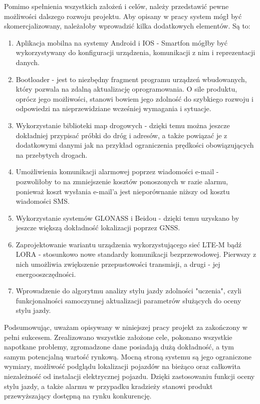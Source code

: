 Pomimo spełnienia wszystkich założeń i celów, należy przedstawić pewne możliwości dalszego rozwoju projektu. Aby opisany w pracy system mógł być skomercjalizowany, należałoby wprowadzić kilka dodatkowych elementów. Są to:

\begin{enumerate}
\item Aplikacja mobilna na systemy Android i IOS - Smartfon mógłby być wykorzystywany do konfiguracji urządzenia, komunikacji z nim i reprezentacji danych.
\item Bootloader - jest to niezbędny fragment programu urządzeń wbudowanych, który pozwala na zdalną aktualizację oprogramowania. O sile produktu, oprócz jego możliwości, stanowi bowiem jego zdolność do szybkiego rozwoju i odpowiedzi na nieprzewidziane wcześniej wymagania i sytuacje.
\item Wykorzystanie biblioteki map drogowych - dzięki temu można jeszcze dokładniej przypisać próbki do dróg i adresów, a także powiązać je z dodatkowymi danymi jak na przykład ograniczenia prędkości obowiązujących na przebytych drogach.
\item Umożliwienia komunikacji alarmowej poprzez wiadomości e-mail - pozwoliłoby to na zmniejszenie kosztów ponoszonych w razie alarmu, ponieważ koszt wysłania e-mail'a jest nieporównanie niższy od kosztu wiadomości SMS.
\item Wykorzystanie systemów GLONASS i Beidou - dzięki temu uzyskano by jeszcze większą dokładność lokalizacji poprzez GNSS.
\item Zaprojektowanie wariantu urządzenia wykorzystującego sieć LTE-M bądź LORA - stosunkowo nowe standardy komunikacji bezprzewodowej. Pierwszy z nich umożliwia zwiększenie przepustowości transmisji, a drugi - jej energooszczędności.
\item Wprowadzenie do algorytmu analizy stylu jazdy zdolności "uczenia", czyli funkcjonalności samoczynnej aktualizacji parametrów służących do oceny stylu jazdy.
\end{enumerate} 

Podsumowując, uważam opisywany w niniejszej pracy projekt za zakończony w pełni sukcesem. Zrealizowano wszystkie założone cele, pokonano wszystkie napotkane problemy, zgromadzone dane posiadają dużą dokładność, a tym samym potencjalną wartość rynkową. Mocną stroną systemu są jego ograniczone wymiary, możliwość podglądu lokalizacji pojazdów na bieżąco oraz całkowita niezależność od instalacji elektrycznej pojazdu. Dzięki zastosowaniu funkcji oceny stylu jazdy, a także alarmu w przypadku kradzieży stanowi produkt przewyższający dostępną na rynku konkurencję.